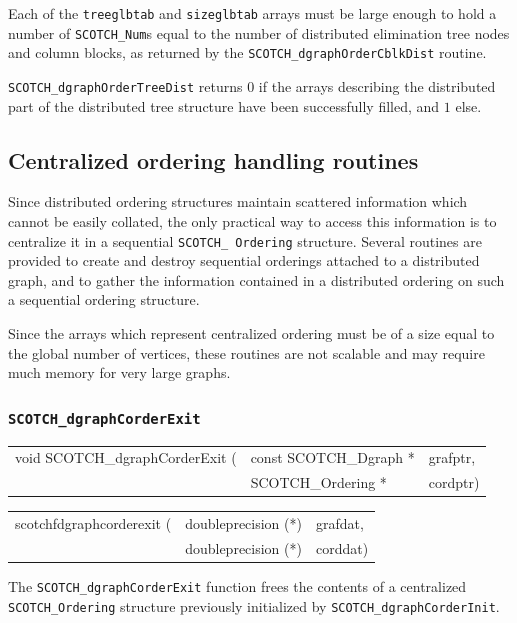 \begin{itemize}
Each of the {\tt treeglbtab} and {\tt size\lbt glb\lbt tab} arrays
must be large enough to hold a number of {\tt SCOTCH\_\lbt Num}s equal
to the number of distributed elimination tree nodes and column blocks,
as returned by the {\tt SCOTCH\_\lbt dgraph\lbt Order\lbt Cblk\lbt Dist}
routine.

\progret

{\tt SCOTCH\_dgraphOrderTreeDist} returns $0$ if the arrays describing
the distributed part of the distributed tree structure have been
successfully filled, and $1$ else.
\end{itemize}

\subsection{Centralized ordering handling routines}
\label{sec-lib-func-corder}

Since distributed ordering structures maintain scattered information
which cannot be easily collated, the only practical way to access this
information is to centralize it in a sequential {\tt SCOTCH\_\lbt
Ordering} structure. Several routines are provided to
create and destroy sequential orderings attached to a distributed
graph, and to gather the information contained in a distributed
ordering on such a sequential ordering structure.

Since the arrays which represent centralized ordering must be of a
size equal to the global number of vertices, these routines are not
scalable and may require much memory for very large graphs.

\subsubsection{{\tt SCOTCH\_dgraphCorderExit}}

\begin{itemize}
\progsyn

{\tt\begin{tabular}{l@{}ll}
void SCOTCH\_dgraphCorderExit ( & const SCOTCH\_Dgraph * & grafptr, \\
                                & SCOTCH\_Ordering *     & cordptr)
\end{tabular}}

{\tt\begin{tabular}{l@{}ll}
scotchfdgraphcorderexit ( & doubleprecision (*) & grafdat, \\
                          & doubleprecision (*) & corddat)
\end{tabular}}

\progdes

The {\tt SCOTCH\_dgraphCorderExit} function frees the contents of a
centralized {\tt SCOTCH\_\lbt Ordering} structure previously
initialized by {\tt SCOTCH\_\lbt dgraph\lbt Corder\lbt Init}.
\end{itemize}


